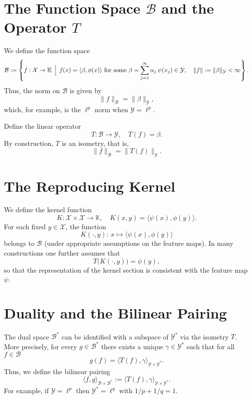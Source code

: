 \section{The Function Space \(\mathcal{B}\) and the Operator \(T\)}

We define the function space
\[
\mathcal{B} := \left\{ f:\mathcal{X}\to \mathbb{K}\,\Bigm|\, f(x)= \langle \beta, \phi(x)\rangle \text{ for some } \beta = \sum_{j=1}^\infty \alpha_j\, \psi(x_j)\in \mathcal{Y},\quad \|f\| := \|\beta\|_{\mathcal{Y}} < \infty \right\}.
\]
Thus, the norm on \(\mathcal{B}\) is given by
\[
\|f\|_{\mathcal{B}} = \|\beta\|_{\mathcal{Y}},
\]
which, for example, is the \(\ell^p\) norm when \(\mathcal{Y} = \ell^p\).

Define the linear operator
\[
T:\mathcal{B}\to \mathcal{Y}, \quad T(f) = \beta.
\]
By construction, \(T\) is an isometry, that is,
\[
\|f\|_{\mathcal{B}} = \|T(f)\|_{\mathcal{Y}}.
\]

\section{The Reproducing Kernel}

We define the kernel function
\[
K:\mathcal{X}\times\mathcal{X}\to \mathbb{K},\quad K(x,y)= \langle \psi(x), \phi(y)\rangle.
\]
For each fixed \(y\in \mathcal{X}\), the function
\[
K(\cdot,y): \, x \mapsto \langle \psi(x), \phi(y)\rangle
\]
belongs to \(\mathcal{B}\) (under appropriate assumptions on the feature maps). In many constructions one further assumes that
\[
T\bigl(K(\cdot,y)\bigr)= \psi(y),
\]
so that the representation of the kernel section is consistent with the feature map \(\psi\).

\section{Duality and the Bilinear Pairing}

The dual space \(\mathcal{B}^*\) can be identified with a subspace of \(\mathcal{Y}^*\) via the isometry \(T\). More precisely, for every \(g\in \mathcal{B}^*\) there exists a unique \(\gamma\in \mathcal{Y}^*\) such that for all \(f\in \mathcal{B}\)
\[
g(f)= \langle T(f), \gamma\rangle_{\mathcal{Y}\times\mathcal{Y}^*}.
\]
Thus, we define the bilinear pairing
\[
\langle f, g \rangle_{\mathcal{B}\times \mathcal{B}^*} := \langle T(f), \gamma\rangle_{\mathcal{Y}\times\mathcal{Y}^*}.
\]
For example, if \(\mathcal{Y}=\ell^p\) then \(\mathcal{Y}^*=\ell^q\) with \(1/p+1/q=1\).

